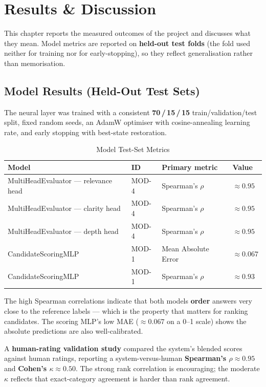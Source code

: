\documentclass[12pt,a4paper,oneside]{report}
\begin{document}
\chapter{Results \& Discussion}
\label{ch:results}

This chapter reports the measured outcomes of the project and discusses what they mean. Model
metrics are reported on \textbf{held-out test folds} (the fold used neither for training nor
for early-stopping), so they reflect generalisation rather than memorisation.

\section{Model Results (Held-Out Test Sets)}

The neural layer was trained with a consistent \textbf{70\,/\,15\,/\,15} train/validation/test
split, fixed random seeds, an AdamW optimiser with cosine-annealing learning rate, and early
stopping with best-state restoration.

\begin{table}[H]
\centering
\caption{Model Test-Set Metrics}
\label{tab:modelmetrics}
\begin{tabularx}{\textwidth}{L{6cm}C{2cm}L{3.5cm}C{2cm}}
\toprule
\textbf{Model} & \textbf{ID} & \textbf{Primary metric} & \textbf{Value} \\
\midrule
MultiHeadEvaluator --- relevance head & MOD-4 & Spearman's $\rho$ & $\approx 0.95$ \\
MultiHeadEvaluator --- clarity head   & MOD-4 & Spearman's $\rho$ & $\approx 0.95$ \\
MultiHeadEvaluator --- depth head     & MOD-4 & Spearman's $\rho$ & $\approx 0.95$ \\
CandidateScoringMLP                   & MOD-1 & Mean Absolute Error & $\approx 0.067$ \\
CandidateScoringMLP                   & MOD-1 & Spearman's $\rho$ & $\approx 0.93$ \\
\bottomrule
\end{tabularx}
\end{table}

The high Spearman correlations indicate that both models \textbf{order} answers very close to
the reference labels --- which is the property that matters for ranking candidates. The scoring
MLP's low MAE ($\approx 0.067$ on a 0--1 scale) shows the absolute predictions are also
well-calibrated.

A \textbf{human-rating validation study} compared the system's blended scores against human
ratings, reporting a system-versus-human \textbf{Spearman's $\rho \approx 0.95$} and
\textbf{Cohen's $\kappa \approx 0.50$}. The strong rank correlation is encouraging; the
moderate $\kappa$ reflects that exact-category agreement is harder than rank agreement.
\end{document}
